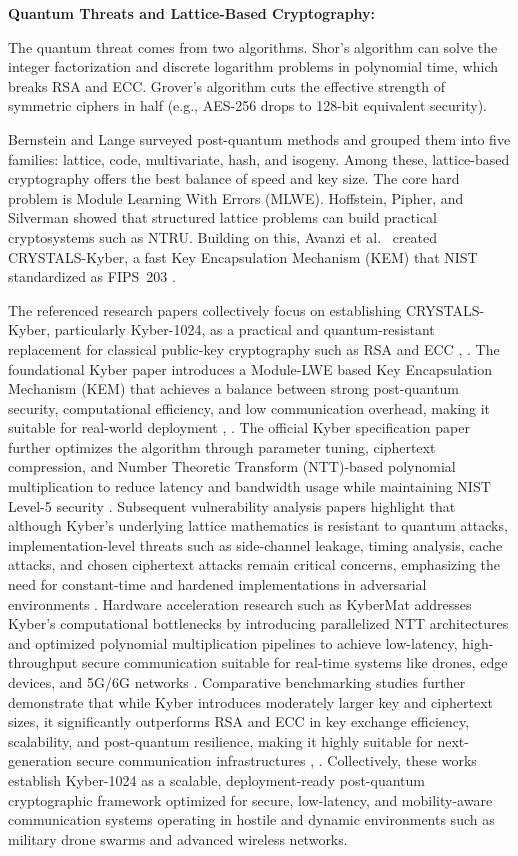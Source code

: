 \documentclass{ieeeaccess}
\begin{document}
\vspace{2mm}\noindent\textbf{Quantum Threats and Lattice-Based Cryptography:}

The quantum threat comes from two algorithms. Shor's algorithm \cite{ref9} can solve the integer factorization and discrete logarithm problems in polynomial time, which breaks RSA and ECC. Grover's algorithm \cite{ref10} cuts the effective strength of symmetric ciphers in half (e.g., AES-256 drops to 128-bit equivalent security).

Bernstein and Lange \cite{ref7} surveyed post-quantum methods and grouped them into five families: lattice, code, multivariate, hash, and isogeny. Among these, lattice-based cryptography offers the best balance of speed and key size. The core hard problem is Module Learning With Errors (MLWE). Hoffstein, Pipher, and Silverman \cite{ref25} showed that structured lattice problems can build practical cryptosystems such as NTRU. Building on this, Avanzi et al.~\cite{ref8} created CRYSTALS-Kyber, a fast Key Encapsulation Mechanism (KEM) that NIST standardized as FIPS~203 \cite{ref6}.

The referenced research papers collectively focus on establishing CRYSTALS-Kyber, particularly Kyber-1024, as a practical and quantum-resistant replacement for classical public-key cryptography such as RSA and ECC \cite{ref32}, \cite{ref36}. The foundational Kyber paper introduces a Module-LWE based Key Encapsulation Mechanism (KEM) that achieves a balance between strong post-quantum security, computational efficiency, and low communication overhead, making it suitable for real-world deployment \cite{ref32}, \cite{ref38}. The official Kyber specification paper further optimizes the algorithm through parameter tuning, ciphertext compression, and Number Theoretic Transform (NTT)-based polynomial multiplication to reduce latency and bandwidth usage while maintaining NIST Level-5 security \cite{ref33}. Subsequent vulnerability analysis papers highlight that although Kyber's underlying lattice mathematics is resistant to quantum attacks, implementation-level threats such as side-channel leakage, timing analysis, cache attacks, and chosen ciphertext attacks remain critical concerns, emphasizing the need for constant-time and hardened implementations in adversarial environments \cite{ref34}. Hardware acceleration research such as KyberMat addresses Kyber's computational bottlenecks by introducing parallelized NTT architectures and optimized polynomial multiplication pipelines to achieve low-latency, high-throughput secure communication suitable for real-time systems like drones, edge devices, and 5G/6G networks \cite{ref35}. Comparative benchmarking studies further demonstrate that while Kyber introduces moderately larger key and ciphertext sizes, it significantly outperforms RSA and ECC in key exchange efficiency, scalability, and post-quantum resilience, making it highly suitable for next-generation secure communication infrastructures \cite{ref36}, \cite{ref37}. Collectively, these works establish Kyber-1024 as a scalable, deployment-ready post-quantum cryptographic framework optimized for secure, low-latency, and mobility-aware communication systems operating in hostile and dynamic environments such as military drone swarms and advanced wireless networks.
\end{document}
